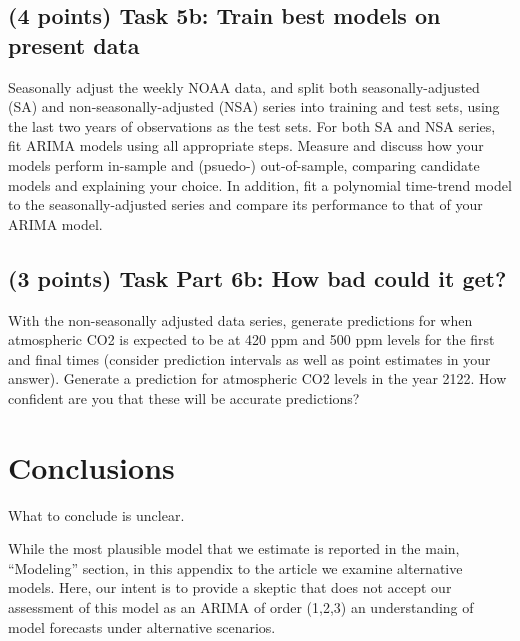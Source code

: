 \documentclass[AER]{AEA}
\begin{document}
\hypertarget{points-task-5b-train-best-models-on-present-data}{%
\subsection{(4 points) Task 5b: Train best models on present
data}\label{points-task-5b-train-best-models-on-present-data}}

Seasonally adjust the weekly NOAA data, and split both
seasonally-adjusted (SA) and non-seasonally-adjusted (NSA) series into
training and test sets, using the last two years of observations as the
test sets. For both SA and NSA series, fit ARIMA models using all
appropriate steps. Measure and discuss how your models perform in-sample
and (psuedo-) out-of-sample, comparing candidate models and explaining
your choice. In addition, fit a polynomial time-trend model to the
seasonally-adjusted series and compare its performance to that of your
ARIMA model.

\hypertarget{points-task-part-6b-how-bad-could-it-get}{%
\subsection{(3 points) Task Part 6b: How bad could it
get?}\label{points-task-part-6b-how-bad-could-it-get}}

With the non-seasonally adjusted data series, generate predictions for
when atmospheric CO2 is expected to be at 420 ppm and 500 ppm levels for
the first and final times (consider prediction intervals as well as
point estimates in your answer). Generate a prediction for atmospheric
CO2 levels in the year 2122. How confident are you that these will be
accurate predictions?

\hypertarget{conclusions}{%
\section{Conclusions}\label{conclusions}}

What to conclude is unclear.

While the most plausible model that we estimate is reported in the main,
``Modeling'' section, in this appendix to the article we examine
alternative models. Here, our intent is to provide a skeptic that does
not accept our assessment of this model as an ARIMA of order (1,2,3) an
understanding of model forecasts under alternative scenarios.
\end{document}
